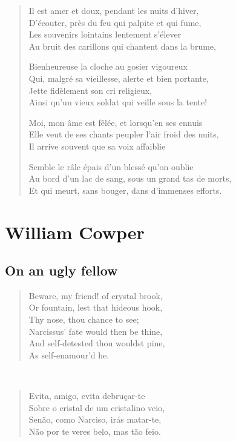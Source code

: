 \documentclass[10pt,a5paper,oneside]{book}
\begin{document}
\begin{verse}
Il est amer et doux, pendant les nuits d'hiver,\\
D'écouter, près du feu qui palpite et qui fume,\\
Les souvenirs lointains lentement s'élever\\
Au bruit des carillons qui chantent dans la brume,

Bienheureuse la cloche au gosier vigoureux\\
Qui, malgré sa vieillesse, alerte et bien portante,\\
Jette fidèlement son cri religieux,\\
Ainsi qu'un vieux soldat qui veille sous la tente!

Moi, mon âme est fêlée, et lorsqu'en ses ennuis\\
Elle veut de ses chants peupler l'air froid des nuits,\\
Il arrive souvent que sa voix affaiblie

Semble le râle épais d'un blessé qu'on oublie\\
Au bord d'un lac de sang, sous un grand tas de morts,\\
Et qui meurt, sans bouger, dans d'immenses efforts.
\end{verse}

\part{William Cowper}

\chapter{On an ugly fellow}

\begin{verse}
Beware, my friend! of crystal brook,\\
Or fountain, lest that hideous hook,\\
Thy nose, thou chance to see;\\
Narcissus' fate would then be thine,\\
And self-detested thou wouldst pine,\\
As self-enamour'd he.
\end{verse}

~

\begin{verse} \footnotesize
Evita, amigo, evita debruçar-te\\
Sobre o cristal de um cristalino veio,\\
Senão, como Narciso, irás matar-te,\\
Não por te veres belo, mas tão feio.
\end{verse}
\end{document}
